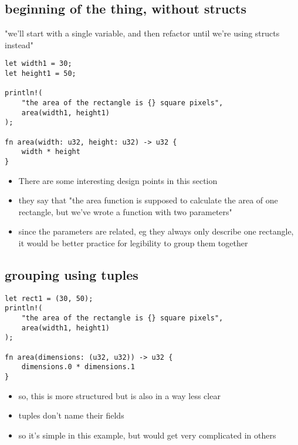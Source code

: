 \documentclass[11pt]{article}
\begin{document}
\subsection{beginning of the thing, without structs}
\label{sec:org3fb9a63}
"we'll start with a single variable, and then refactor until we're using structs instead"
\begin{verbatim}
let width1 = 30;
let height1 = 50;

println!(
    "the area of the rectangle is {} square pixels",
    area(width1, height1)
);

fn area(width: u32, height: u32) -> u32 {
    width * height
}
\end{verbatim}
\begin{itemize}
\item There are some interesting design points in this section
\item they say that "the area function is supposed to calculate the area of one rectangle, but we've wrote a function with two parameters"
\item since the parameters are related, eg they always only describe one rectangle, it would be better practice for legibility to group them together
\end{itemize}
\subsection{grouping using tuples}
\label{sec:orgb49cd7c}
\begin{verbatim}
let rect1 = (30, 50);
println!(
    "the area of the rectangle is {} square pixels",
    area(width1, height1)
);

fn area(dimensions: (u32, u32)) -> u32 {
    dimensions.0 * dimensions.1
}
\end{verbatim}
\begin{itemize}
\item so, this is more structured but is also in a way less clear
\item tuples don't name their fields
\item so it's simple in this example, but would get very complicated in others
\end{itemize}
\end{document}

